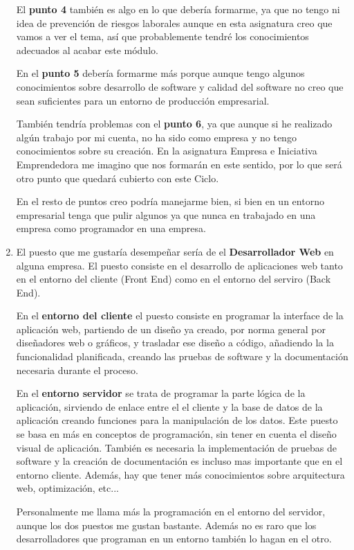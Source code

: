 \begin{enumerate}[label=(\alph*)]
     El \textbf{punto 4} también es algo en lo que debería formarme, ya que no tengo ni idea de prevención de riesgos laborales aunque en esta asignatura creo que vamos a ver el tema, así que probablemente tendré los conocimientos adecuados al acabar este módulo.

     En el \textbf{punto 5} debería formarme más porque aunque tengo algunos conocimientos sobre desarrollo de software y calidad del software no creo que sean suficientes para un entorno de producción empresarial.

     También tendría problemas con el \textbf{punto 6}, ya que aunque si he realizado algún trabajo por mi cuenta, no ha sido como empresa y no tengo conocimientos sobre su creación. En la asignatura Empresa e Iniciativa Emprendedora me imagino que nos formarán en este sentido, por lo que será otro punto que quedará cubierto con este Ciclo.

     En el resto de puntos creo podría manejarme bien, si bien en un entorno empresarial tenga que pulir algunos ya que nunca en trabajado en una empresa como programador en una empresa.

     \item El puesto que me gustaría desempeñar sería de el \textbf{Desarrollador Web} en alguna empresa. El puesto consiste en el desarrollo de aplicaciones web tanto en el entorno del cliente (Front End) como en el entorno del serviro (Back End).

     En el \textbf{entorno del cliente} el puesto consiste en programar la interface de la aplicación web, partiendo de un diseño ya creado, por norma general por diseñadores web o gráficos, y trasladar ese diseño a código, añadiendo la la funcionalidad planificada, creando las pruebas de software y la documentación necesaria durante el proceso.

     En el \textbf{entorno servidor} se trata de programar la parte lógica de la aplicación, sirviendo de enlace entre el el cliente y la base de datos de la aplicación creando funciones para la manipulación de los datos. Este puesto se basa en más en conceptos de programación, sin tener en cuenta el diseño visual de aplicación. También es necesaria la implementación de pruebas de software y la creación de documentación es incluso mas importante que en el entorno cliente. Además, hay que tener más conocimientos sobre arquitectura web, optimización, etc...

     Personalmente me llama más la programación en el entorno del servidor, aunque los dos puestos me gustan bastante. Además no es raro que los desarrolladores que programan en un entorno también lo hagan en el otro.
\end{enumerate}

